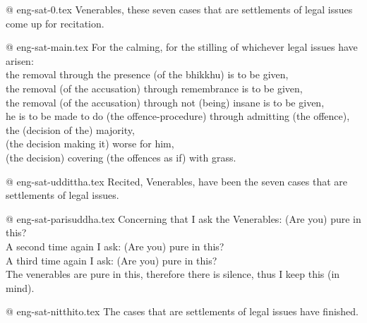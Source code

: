 @ eng-sat-0.tex
Venerables, these seven cases that are settlements of legal issues come up for recitation.

@ eng-sat-main.tex
For the calming, for the stilling of whichever legal issues have arisen:\\
the removal through the presence (of the bhikkhu) is to be given,\\
the removal (of the accusation) through remembrance is to be given,\\
the removal (of the accusation) through not (being) insane is to be given,\\
he is to be made to do (the offence-procedure) through admitting (the offence),\\
the (decision of the) majority,\\
(the decision making it) worse for him,\\
(the decision) covering (the offences as if) with grass.

@ eng-sat-uddittha.tex
Recited, Venerables, have been the seven cases that are settlements of legal issues.

@ eng-sat-parisuddha.tex
Concerning that I ask the Venerables: (Are you) pure in this?\\
A second time again I ask: (Are you) pure in this?\\
A third time again I ask: (Are you) pure in this?\\
The venerables are pure in this, therefore there is silence, thus I keep this (in mind).

@ eng-sat-nitthito.tex
The cases that are settlements of legal issues have finished.
